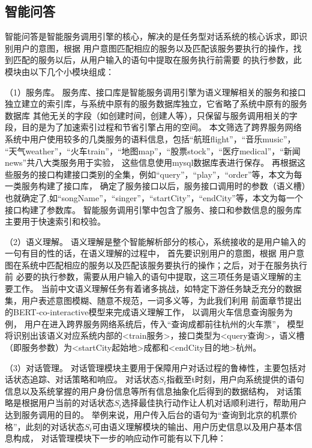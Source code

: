 \subsection{智能问答}
智能问答是智能服务调用引擎的核心，解决的是任务型对话系统的核心诉求，即识别用户的意图，根据
用户意图匹配相应的服务以及匹配该服务要执行的操作，找到匹配的服务以后，从用户输入的语句中提取在服务执行前需要
的执行参数，此模块由以下几个小模块组成：

（1）服务库。
服务库、接口库是智能服务调用引擎为语义理解相关的服务和接口独立建立的索引库，与系统中原有的服务数据库独立，它省略了系统中原有的服务数据库
其他无关的字段（如创建时间，创建人等），只保留与服务调用相关的字段，目的是为了加速索引过程和节省引擎占用的空间。
本文筛选了跨界服务网络系统中用户使用较多的几类服务的语料信息，包括“航班flight”，“音乐music”，
“天气weather”，“火车train”，“地图map”，“股票stock”，“医疗medical”，“新闻news”共八大类服务用于实验，
这些信息使用mysql数据库表进行保存。
再根据这些服务的接口构建接口类别的全集，例如“query”，“play”，“order”等，本文为每一类服务构建了接口库，
确定了服务接口以后，服务接口调用时的参数（语义槽）也就确定了,如“songName”，“singer”，“startCity”，“endCity”等，本文为每一个接口构建了参数库。
智能服务调用引擎中包含了服务、接口和参数信息的服务库主要用于快速索引和校验。

（2）语义理解。 
语义理解是整个智能解析部分的核心，系统接收的是用户输入的一句有目的性的话，在语义理解的过程中，
首先要识别用户的意图，根据
用户意图在系统中匹配相应的服务以及匹配该服务要执行的操作；之后，对于在服务执行前
必要的执行参数，需要从用户输入的语句中提取，这三项任务是语义理解的主要工作。
当前中文语义理解任务有着诸多挑战，如特定下游任务缺乏充分的数据集，用户表述意图模糊、随意不规范，一词多义等，为此我们利用
前面章节提出的BERT-co-interactive模型来完成语义理解工作，
以调用火车信息查询服务为例，
用户在进入跨界服务网络系统后，传入“查询成都前往杭州的火车票”，
模型将识别出该语义对应系统内部的<train服务>，接口类型为<query查询>，语义槽（即服务参数）为<startCity起始地>成都和<endCity目的地>杭州。

（3）对话管理。
对话管理模块主要用于保障用户对话过程的鲁棒性，主要包括对话状态追踪、对话策略和响应。
对话状态$S_{t}$指截至t时刻，用户向系统提供的语句信息以及系统掌握的用户身份信息等所有信息抽象化后得到的数据结构，
对话策略是根据用户当前的对话状态$S_{t}$选择最佳执行动作让人机对话顺利进行，帮助用户达到服务调用的目的。
举例来说，用户传入后台的语句为“查询到北京的机票价格”，此刻的对话状态$S_{t}$可由语义理解模块的输出、用户历史信息以及用户基本信息构成，
对话管理模块下一步的响应动作可能有以下几种：

